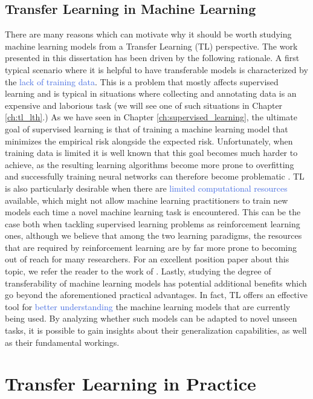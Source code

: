 \subsection{Transfer Learning in Machine Learning}
There are many reasons which can motivate why it should be worth studying machine learning models from a Transfer Learning (TL) perspective. The work presented in this dissertation has been driven by the following rationale. A first typical scenario where it is helpful to have transferable models is characterized by the \textcolor{RoyalBlue}{lack of training data}. This is a problem that mostly affects supervised learning and is typical in situations where collecting and annotating data is an expensive and laborious task (we will see one of such situations in Chapter \ref{ch:tl_lth}.) As we have seen in Chapter \ref{ch:supervised_learning}, the ultimate goal of supervised learning is that of training a machine learning model that minimizes the empirical risk alongside the expected risk. Unfortunately, when training data is limited it is well known that this goal becomes much harder to achieve, as the resulting learning algorithms become more prone to overfitting and successfully training neural networks can therefore become problematic \cite{aggarwal2018neural}. 
TL is also particularly desirable when there are \textcolor{RoyalBlue}{limited computational resources} available, which might not allow machine learning practitioners to train new models each time a novel machine learning task is encountered. This can be the case both when tackling supervised learning problems as reinforcement learning ones, although we believe that among the two learning paradigms, the resources that are required by reinforcement learning are by far more prone to becoming out of reach for many researchers. For an excellent position paper about this topic, we refer the reader to the work of \citet{obando2020revisiting}.
Lastly, studying the degree of transferability of machine learning models has potential additional benefits which go beyond the aforementioned practical advantages. In fact, TL offers an effective tool for \textcolor{RoyalBlue}{better understanding} the machine learning models that are currently being used. By analyzing whether such models can be adapted to novel unseen tasks, it is possible to gain insights about their generalization capabilities, as well as their fundamental workings.


\section{Transfer Learning in Practice}
\label{sec:rationale}

